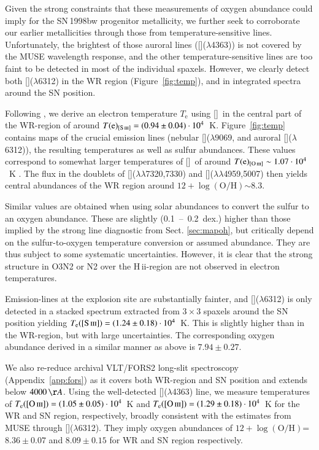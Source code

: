 \documentclass[traditabstract]{aa}
\newcommand{\hii}{\mbox{H\,{\sc ii}}}
\newcommand{\oh}{$12+\log(\mathrm{O/H})$}
\newcommand{\siii}{[\ion{S}{iii}]}
\newcommand{\oii}{[\ion{O}{ii}]}
\newcommand{\oiii}{[\ion{O}{iii}]}
\begin{document}
Given the strong constraints that these measurements of oxygen abundance could imply for the SN\,1998bw progenitor metallicity, we further seek to corroborate our earlier metallicities through those from temperature-sensitive lines. Unfortunately, the brightest of those auroral lines (\oiii($\lambda$4363)) is not covered by the MUSE wavelength response, and the other temperature-sensitive lines are too faint to be detected in most of the individual spaxels. However, we clearly detect both \siii($\lambda$6312) in the WR region (Figure~\ref{fig:temp}), and in integrated spectra around the SN position.



Following \citet{2013ApJS..207...21N}, we derive an electron temperature $T_{\mathrm{e}}$ using \siii\, in the central part of the WR-region of around $T(\mathrm{e})_{\siii}=(0.94\pm0.04)\cdot10^{4}$~K. Figure~\ref{fig:temp} contains maps of the crucial emission lines (nebular \siii($\lambda9069$, and auroral \siii($\lambda$6312)), the resulting temperatures as well as sulfur abundances. These values correspond to somewhat larger temperatures of \oiii~of around $T(\mathrm{e})_{\oiii} \sim 1.07\cdot10^{4}$~K \citep{2006A&A...448..955I, 2012A&A...547A..29B}. The flux in the doublets of \oii($\lambda\lambda$7320,7330) and \oiii($\lambda\lambda$4959,5007) then yields central abundances of the WR region around \oh $\sim 8.3$.

Similar values are obtained when using solar abundances to convert the sulfur to an oxygen abundance. These are slightly (0.1~--~0.2~dex.) higher than those implied by the strong line diagnostic from Sect. \ref{sec:mapoh}, but critically depend on the sulfur-to-oxygen temperature conversion or assumed abundance. They are thus subject to some systematic uncertainties. However, it is clear that the strong structure in O3N2 or N2 over the \hii-region are not observed in electron temperatures.

Emission-lines at the explosion site are substantially fainter, and \siii($\lambda$6312) is only detected in a stacked spectrum extracted from $3\times3$ spaxels around the SN position yielding $T_{\mathrm{e}}(\siii)=(1.24\pm0.18)\cdot10^{4}$~K. This is slightly higher than in the WR-region, but with large uncertainties. The corresponding oxygen abundance derived in a similar manner as above is $7.94\pm0.27$.

We also re-reduce archival VLT/FORS2 long-slit spectroscopy (Appendix~\ref{app:fors}) as it covers both WR-region and SN position and extends below $4000\,\AA$. Using the well-detected \oiii($\lambda$4363) line, we measure temperatures of $T_{\mathrm{e}}(\oiii)=(1.05\pm0.05)\cdot 10^{4}$~K and $T_{\mathrm{e}}(\oiii)=(1.29\pm0.18)\cdot10^{4}$~K for the WR and SN region, respectively, broadly consistent with the estimates from MUSE through \siii($\lambda$6312). They imply oxygen abundances of \oh=$8.36\pm0.07$ and $8.09\pm0.15$ for WR and SN region respectively.
\end{document}
